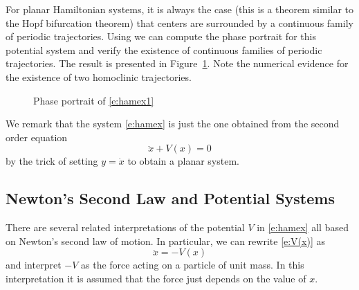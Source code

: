 \documentclass{ximera}
\begin{document}
For planar Hamiltonian systems, it is always the case (this is a theorem
similar to the Hopf bifurcation theorem) that centers are surrounded by 
a continuous family of periodic 
trajectories.  Using 
{\pplane} we can
compute the phase portrait for 
this potential system and verify the 
existence of continuous families of periodic trajectories.  The result 
is presented in Figure~\ref{F:hamex}.  Note the numerical evidence for 
the existence of two homoclinic trajectories.  
\begin{figure}[htb]
           \centerline{%
	   }
           \caption{Phase portrait of \protect\eqref{e:hamex1}}
           \label{F:hamex}
\end{figure}

We remark that the system \eqref{e:hamex} is just the one obtained from the 
second order equation 
\begin{equation}  \label{e:V(x)}
\ddot{x} + V(x) = 0
\end{equation}
by the trick of setting $y=\dot{x}$ to obtain a planar system. 

\subsection*{Newton's Second Law and Potential Systems}

There are several related interpretations of the potential $V$ in
\eqref{e:hamex} all based on Newton's second law of motion. 
  In particular, we can rewrite \eqref{e:V(x)} as 
\[
\ddot{x} =  -V(x)
\]
and interpret $-V$ as the force acting on a 
particle of unit mass.  In this 
interpretation it is assumed that the force just depends on the value of $x$. 
\end{document}
